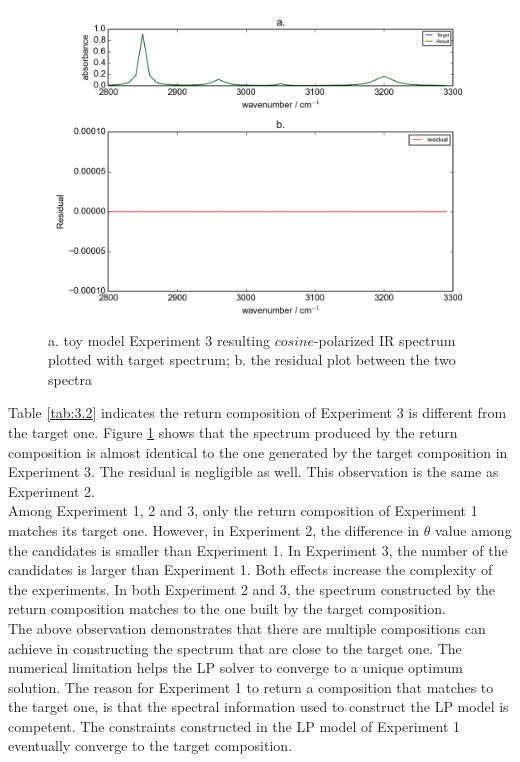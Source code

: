\begin{figure}[!ht] 
\centering
\includegraphics[scale=0.7]{Figures/toy_model_result_plotting_ir_cos_10candi_1.png} 
\caption{a. toy model Experiment 3 resulting $cosine$-polarized IR spectrum plotted with target spectrum; b. the residual plot between the two spectra}
\label{fig:3.3}
\end{figure}

Table \ref{tab:3.2} indicates the return composition of Experiment 3 is different from the target one. Figure \ref{fig:3.3} shows that the spectrum produced by the return composition is almost identical to the one generated by the target composition in Experiment 3. The residual is negligible as well. This observation is the same as Experiment 2. \\

Among Experiment 1, 2 and 3, only the return composition of Experiment 1 matches its target one. However, in Experiment 2, the difference in $\theta$ value among the candidates is smaller than Experiment 1. In Experiment 3, the number of the candidates is larger than Experiment 1. Both effects increase the complexity of the experiments. In both Experiment 2 and 3, the spectrum constructed by the return composition matches to the one built by the target composition. \\

The above observation demonstrates that there are multiple compositions can achieve in constructing the spectrum that are close to the target one. The numerical limitation helps the LP solver to converge to a unique optimum solution. The reason for Experiment 1 to return a composition that matches to the target one, is that the spectral information used to construct the LP model is competent. The constraints constructed in the LP model of Experiment 1 eventually converge to the target composition. \\ 

